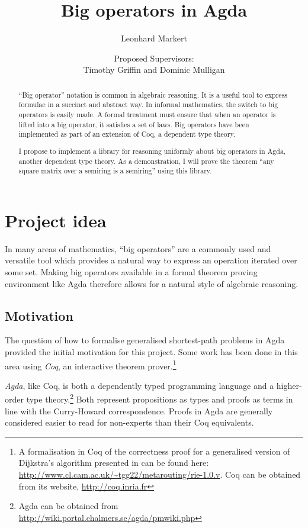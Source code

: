 \documentclass[a4paper]{scrartcl}
\title{Big operators in Agda}
\author{Leonhard Markert}
\date{Proposed Supervisors:\\Timothy Griffin and Dominic Mulligan}
\begin{document}
\maketitle

\begin{abstract}
\enquote{Big operator} notation is common in algebraic reasoning.
It is a useful tool to express formulae in a succinct and abstract way.
In informal mathematics, the switch to big operators is easily made.
A formal treatment must ensure that when an operator is lifted into a big operator, it satisfies a set of laws.
Big operators have been implemented as part of an extension of Coq, a dependent type theory.

I propose to implement a library for reasoning uniformly about big operators in Agda, another dependent type theory.
As a demonstration, I will prove the theorem \enquote{any square matrix over a semiring is a semiring} using this library.
\end{abstract}

\section{Project idea}

In many areas of mathematics, \enquote{big operators} are a commonly used and versatile tool which provides a natural way to express an operation iterated over some set. Making big operators available in a formal theorem proving environment like Agda therefore allows for a natural style of algebraic reasoning.

\subsection{Motivation}

The question of how to formalise generalised shortest-path problems in Agda provided the initial motivation for this project.
Some work has been done in this area using \emph{Coq}, an interactive theorem prover.\footnote{A formalisation in Coq of the correctness proof for a generalised version of Dijkstra's algorithm presented in \autocite{sobrinho_routing_2010} can be found here: \url{http://www.cl.cam.ac.uk/~tgg22/metarouting/rie-1.0.v}. Coq can be obtained from its website, \url{http://coq.inria.fr}}

\emph{Agda}, like Coq, is both a dependently typed programming language and a higher-order type theory.\footnote{Agda can be obtained from \url{http://wiki.portal.chalmers.se/agda/pmwiki.php}} Both represent propositions as types and proofs as terms in line with the Curry-Howard correspondence.
Proofs in Agda are generally considered easier to read for non-experts than their Coq equivalents.
\end{document}
